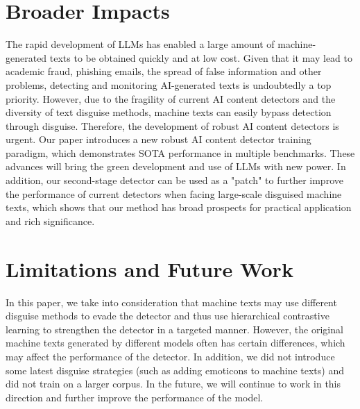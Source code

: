 \documentclass[11pt]{article}
\begin{document}
	\newpage
	
	
	\newpage
	\appendix
	\section{Broader Impacts}
	\label{sec:Impacts}
	The rapid development of LLMs has enabled a large amount of machine-generated texts to be obtained quickly and at low cost. Given that it may lead to academic fraud, phishing emails, the spread of false information and other problems, detecting and monitoring AI-generated texts is undoubtedly a top priority. However, due to the fragility of current AI content detectors and the diversity of text disguise methods, machine texts can easily bypass detection through disguise. Therefore, the development of robust AI content detectors is urgent. Our paper introduces a new robust AI content detector training paradigm, which demonstrates SOTA performance in multiple benchmarks. These advances will bring the green development and use of LLMs with new power. In addition, our second-stage detector can be used as a "patch" to further improve the performance of current detectors when facing large-scale disguised machine texts, which shows that our method has broad prospects for practical application and rich significance.
	
	\section{Limitations and Future Work}
	In this paper, we take into consideration that machine texts may use different disguise methods to evade the detector and thus use hierarchical contrastive learning to strengthen the detector in a targeted manner. However, the original machine texts generated by different models often has certain differences, which may affect the performance of the detector. In addition, we did not introduce some latest disguise strategies (such as adding emoticons to machine texts) and did not train on a larger corpus. In the future, we will continue to work in this direction and further improve the performance of the model.
\end{document}
